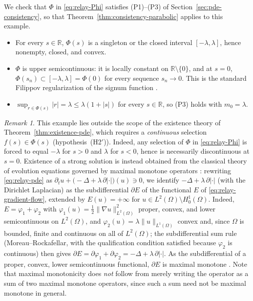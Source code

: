 \documentclass[11pt]{elsarticle}
\theoremstyle{definition}
\theoremstyle{remark}
\newtheorem{remark}[theorem]{Remark}
\numberwithin{equation}{section}
\begin{document}
We check that $\Phi$ in \eqref{eq:relay-Phi} satisfies (P1)--(P3) of
Section~\ref{sec:pde-consistency}, so that Theorem~\ref{thm:consistency-parabolic}
applies to this example.
\begin{itemize}
	\item[(P1)] For every $s\in\mathbb{R}$, $\Phi(s)$ is a singleton or the
	closed interval $[-\lambda,\lambda]$, hence nonempty, closed, and convex.
	\item[(P2)] $\Phi$ is upper semicontinuous: it is locally constant on
	$\mathbb{R}\setminus\{0\}$, and at $s=0$, $\Phi(s_n)\subset[-\lambda,\lambda]=\Phi(0)$
	for every sequence $s_n\to0$. This is the standard Filippov
	regularization of the signum function \cite{Filippov1988}.
	\item[(P3)] $\sup_{r\in\Phi(s)}|r| = \lambda \le \lambda(1+|s|)$ for every
	$s\in\mathbb{R}$, so (P3) holds with $m_0=\lambda$.
\end{itemize}


\begin{remark}
	This example lies outside the scope of the existence theory of
	Theorem~\ref{thm:existence-pde}, which requires a \emph{continuous}
	selection $f(s)\in\Phi(s)$ (hypothesis~(H2$'$)). Indeed, any selection of
	$\Phi$ in \eqref{eq:relay-Phi} is forced to equal $-\lambda$ for $s>0$
	and $\lambda$ for $s<0$, hence is necessarily discontinuous at $s=0$.
	Existence of a strong solution is instead obtained from the classical
	theory of evolution equations governed by maximal monotone operators
	\cite{Brezis1973}: rewriting \eqref{eq:relay-pde} as
	$\partial_t u + \bigl(-\Delta+\lambda\,\partial|\cdot|\bigr)(u)\ni 0$,
	we identify $-\Delta+\lambda\,\partial|\cdot|$ (with the Dirichlet
	Laplacian) as the subdifferential $\partial E$ of the functional $E$ of
	\eqref{eq:relay-gradient-flow}, extended by $E(u)=+\infty$ for
	$u\in L^2(\Omega)\setminus H_0^1(\Omega)$. Indeed, $E=\varphi_1+\varphi_2$
	with $\varphi_1(u)=\tfrac12\|\nabla u\|_{L^2(\Omega)}^2$ proper, convex,
	and lower semicontinuous on $L^2(\Omega)$, and
	$\varphi_2(u)=\lambda\|u\|_{L^1(\Omega)}$ convex and, since $\Omega$ is
	bounded, finite and continuous on all of $L^2(\Omega)$; the subdifferential
	sum rule (Moreau--Rockafellar, with the qualification condition satisfied
	because $\varphi_2$ is continuous) then gives
	$\partial E=\partial\varphi_1+\partial\varphi_2
	=-\Delta+\lambda\,\partial|\cdot|$. As the subdifferential of a proper,
	convex, lower semicontinuous functional, $\partial E$ is maximal monotone
	\cite{Brezis1973}. Note that maximal monotonicity does \emph{not} follow
	from merely writing the operator as a sum of two maximal monotone
	operators, since such a sum need not be maximal monotone in general.
\end{remark}
\end{document}
